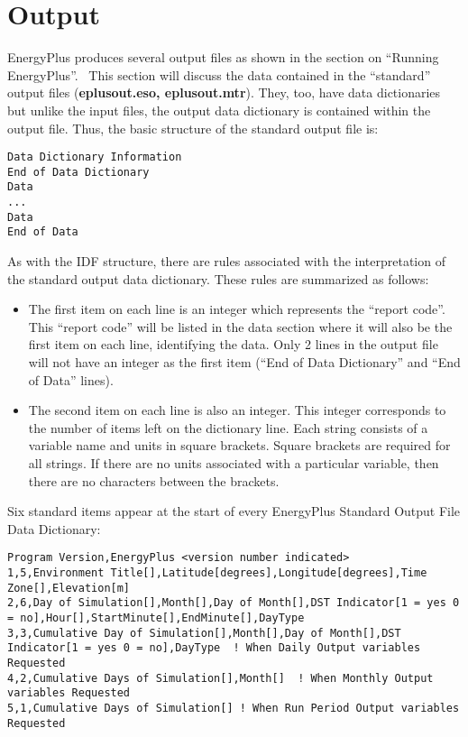 \chapter{Output}\label{output}

EnergyPlus produces several output files as shown in the section on ``Running EnergyPlus''.~ This section will discuss the data contained in the ``standard'' output files (\textbf{eplusout.eso, eplusout.mtr}). They, too, have data dictionaries but unlike the input files, the output data dictionary is contained within the output file. Thus, the basic structure of the standard output file is:

\begin{lstlisting}
Data Dictionary Information
End of Data Dictionary
Data
...
Data
End of Data
\end{lstlisting}

As with the IDF structure, there are rules associated with the interpretation of the standard output data dictionary. These rules are summarized as follows:

\begin{itemize}
\item
  The first item on each line is an integer which represents the ``report code''. This ``report code'' will be listed in the data section where it will also be the first item on each line, identifying the data. Only 2 lines in the output file will not have an integer as the first item (``End of Data Dictionary'' and ``End of Data'' lines).
\item
  The second item on each line is also an integer. This integer corresponds to the number of items left on the dictionary line. Each string consists of a variable name and units in square brackets. Square brackets are required for all strings. If there are no units associated with a particular variable, then there are no characters between the brackets.
\end{itemize}

Six standard items appear at the start of every EnergyPlus Standard Output File Data Dictionary:

\begin{lstlisting}
Program Version,EnergyPlus <version number indicated>
1,5,Environment Title[],Latitude[degrees],Longitude[degrees],Time Zone[],Elevation[m]
2,6,Day of Simulation[],Month[],Day of Month[],DST Indicator[1 = yes 0 = no],Hour[],StartMinute[],EndMinute[],DayType
3,3,Cumulative Day of Simulation[],Month[],Day of Month[],DST Indicator[1 = yes 0 = no],DayType  ! When Daily Output variables Requested
4,2,Cumulative Days of Simulation[],Month[]  ! When Monthly Output variables Requested
5,1,Cumulative Days of Simulation[] ! When Run Period Output variables Requested
\end{lstlisting}


